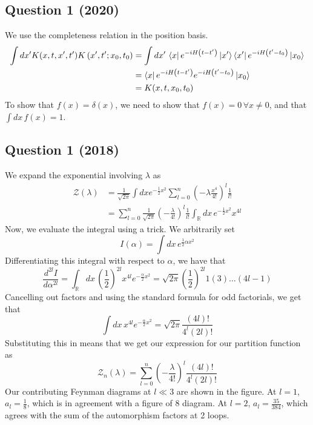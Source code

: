 \documentclass[11pt, oneside]{article}   	%
\theoremstyle{slanted}
\begin{document}
\subsection*{Question 1 (2020)}
We use the completeness relation 
in the position basis. 
\begin{align*}
	\int dx ' K ( x, t, x ' , t ' ) K \left( x' , t ' ; x_0 , t_0  \right)  
	&=  \int dx ' \, \bra{ x } e ^{  - i H \left( t - t '  \right)  } 
	\ket{ x' } \bra{ x ' } e ^{  - i H \left(  t ' -  t_0  \right)  } \ket{ x_0 } \\ 
	&=  \bra{ x } e ^{  - i H \left(  t - t '  \right)  } e ^{   - i H 
	\left( t '  - t_0  \right)  } \ket{ x_0 }  \\ 
	&=  K ( x, t , x_0 , t_0 ) 
\end{align*}
To show that $ f ( x )  = \delta ( x ) $, 
we need to show that $ f (x )  = 0 \, \forall x \neq 0 $, 
and that $ \int dx \, f ( x )  = 1 $. 

\subsection*{Question 1 (2018)}
We expand the exponential 
involving $ \lambda $ as 
\begin{align*}
	\mathcal{ Z } \left( \lambda  \right)   & = \frac{1}{\sqrt{ 2 \pi }  } 
	\int dx e ^{  - \frac{1}{2 } x ^ 2 } \sum_{ l = 0 } ^ n 
	\left(  - \lambda \frac{x ^ 4 }{ 4 ! }  \right)  ^ l \frac{1}{l ! } \\
						&=  \sum_{l = 0 }^{ n }  \frac{1}{\sqrt{ 2 \pi }  } \left(  - \frac{\lambda}{4 ! }  \right) ^{ l } \frac{1}{l ! } \int_{ \mathbb{ R } } dx \, 
						e ^{  - \frac{1}{2 } x ^ 2 } x ^{ 4l } 
\end{align*}
Now, we evaluate the integral using a trick. 
We arbitrarily set 
\[
 I ( \alpha )  = \int dx \, e ^{ \frac{1}{2 } \alpha x ^ 2 } 
\] Differentiating this integral with respect to $ \alpha $, 
we have that 
\[
	\frac{d ^{ 2l } I }{ d \alpha ^{ 2l } }  = \int_{ \mathbb{ R } } 
	dx \, \left( \frac{1}{2 }  \right)^{ 2l } x ^{ 4l } e ^{  - \frac{\alpha}{2 } x ^ 2 }
	= \sqrt{ 2 \pi }  \left( \frac{1}{2 }  \right)  ^{ 2l } 1 \left( 3  \right)  \dots 
	\left( 4l - 1  \right)  
\] Cancelling out factors and using the 
standard formula for odd factorials, 
we get that 
\[
	\int dx \, x ^{ 4l } e ^{  - \frac{\alpha}{2 } x ^ 2 }  = \sqrt{ 2 \pi }  \frac{\left( 4l  \right)  ! }{ 4 ^ l \left( 2l  \right)  ! }
\] Substituting this in 
means that we get our expression for our 
partition function as 
\[
	\mathcal{ Z } _ n \left( \lambda  \right)   = 
	\sum_{ l = 0 } ^ n \left( - \frac{ \lambda }{ 4 ! }  \right)^{ l } 
	\frac{\left( 4l  \right)  ! }{  4 ^ l \left( 2l  \right)  ! }
\]
Our contributing Feynman diagrams 
at $ l \ll 3 $ are shown in the figure.
At $ l  = 1$,  $a_ l = \frac{1}{8 } $, 
which is in agreement with a figure of $ 8 $ 
diagram. At $l  =2  $, $ a _ l  = \frac{35}{384}$, 
which agrees with the sum of the automorphism factors 
at 2 loops.
\end{document}
